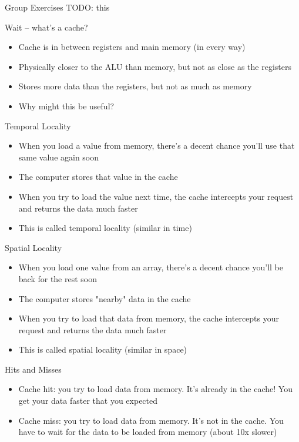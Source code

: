 \begin{frame}{Group Exercises}
	TODO: this
\end{frame}


\begin{frame}{Wait -- what's a cache?}
	\begin{itemize}
		\item Cache is in between registers and main memory (in every way)
		\item Physically closer to the ALU than memory, but not as close as the registers
		\item Stores more data than the registers, but not as much as memory
		\item Why might this be useful?
	\end{itemize}
\end{frame}

\begin{frame}{Temporal Locality}
	\begin{itemize}
		\item When you load a value from memory, there's a decent chance you'll use that same value again soon
		\item The computer stores that value in the cache
		\item When you try to load the value next time, the cache intercepts your request and returns the data much faster
		\item This is called temporal locality (similar in time)
	\end{itemize}
\end{frame}

\begin{frame}{Spatial Locality}
	\begin{itemize}
		\item When you load one value from an array, there's a decent chance you'll be back for the rest soon
		\item The computer stores "nearby" data in the cache
		\item When you try to load that data from memory, the cache intercepts your request and returns the data much faster
		\item This is called spatial locality (similar in space)
	\end{itemize}
\end{frame}

\begin{frame}{Hits and Misses}
	\begin{itemize}
		\item Cache hit: you try to load data from memory. It's already in the cache! You get your data faster that you expected
		\item Cache miss: you try to load data from memory. It's not in the cache. You have to wait for the data to be loaded from memory (about 10x slower)
	\end{itemize}
\end{frame}

